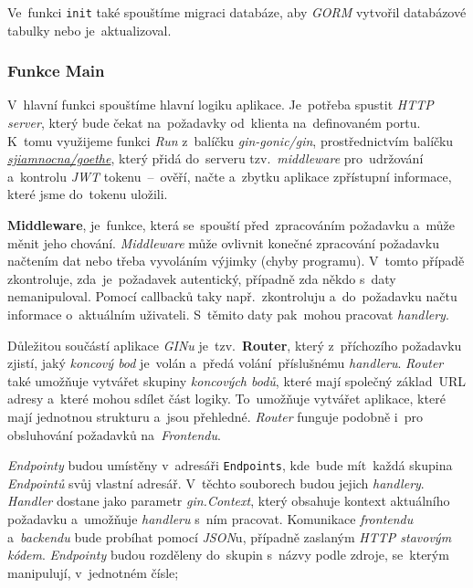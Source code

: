 \documentclass[10pt,a4paper]{article}
\begin{document}
            Ve~funkci \texttt{init} také spouštíme migraci databáze, aby \emph{GORM} vytvořil databázové tabulky nebo je~aktualizoval.


            \subsubsection{Funkce Main}
            V~hlavní funkci spouštíme hlavní logiku aplikace. Je~potřeba spustit \emph{HTTP server}, který bude čekat na~požadavky od~klienta na~definovaném portu. K~tomu využijeme funkci \emph{Run} z~balíčku \emph{gin-gonic/gin}, prostřednictvím balíčku \href{https://gitlab.com/sjiamnocna/goethe}{\emph{sjiamnocna/goethe}}, který přidá do~serveru tzv.~\emph{middleware} pro~udržování a~kontrolu \emph{JWT} tokenu~--~ověří, načte a~zbytku aplikace zpřístupní informace, které jsme do~tokenu uložili.
            
            \textbf{Middleware}, je~funkce, která se~spouští před~zpracováním požadavku a~může měnit jeho chování. \emph{Middleware} může ovlivnit konečné zpracování požadavku načtením dat nebo třeba vyvoláním výjimky (chyby programu). V~tomto případě zkontroluje, zda~je~požadavek autentický, případně zda někdo s~daty nemanipuloval. Pomocí callbacků taky např.~zkontroluju a~do~požadavku načtu informace o~aktuálním uživateli. S~těmito daty pak~mohou pracovat \emph{handlery}.

            Důležitou součástí aplikace \emph{GINu} je~tzv.~\textbf{Router}, který z~příchozího požadavku zjistí, jaký \emph{koncový bod} je~volán a~předá volání~příslušnému \emph{handleru}. \emph{Router} také umožňuje vytvářet skupiny \emph{koncových bodů}, které mají společný základ~URL adresy a~které mohou sdílet část logiky. To~umožňuje vytvářet aplikace, které mají jednotnou strukturu a~jsou přehledné. \emph{Router} funguje podobně i~pro obsluhování požadavků na~\emph{Frontendu}.

            \emph{Endpointy} budou umístěny v~adresáři \texttt{Endpoints}, kde~bude mít~každá skupina \emph{Endpointů} svůj vlastní adresář. V~těchto souborech budou jejich \emph{handlery}. \emph{Handler} dostane jako parametr \emph{gin.Context}, který obsahuje kontext aktuálního požadavku a~umožňuje \emph{handleru} s~ním pracovat. Komunikace \emph{frontendu} a~\emph{backendu} bude probíhat pomocí \emph{JSON}u, případně zaslaným \emph{HTTP stavovým kódem}. \emph{Endpointy} budou rozděleny do~skupin s~názvy podle zdroje, se~kterým manipulují, v~jednotném čísle;
\end{document}
